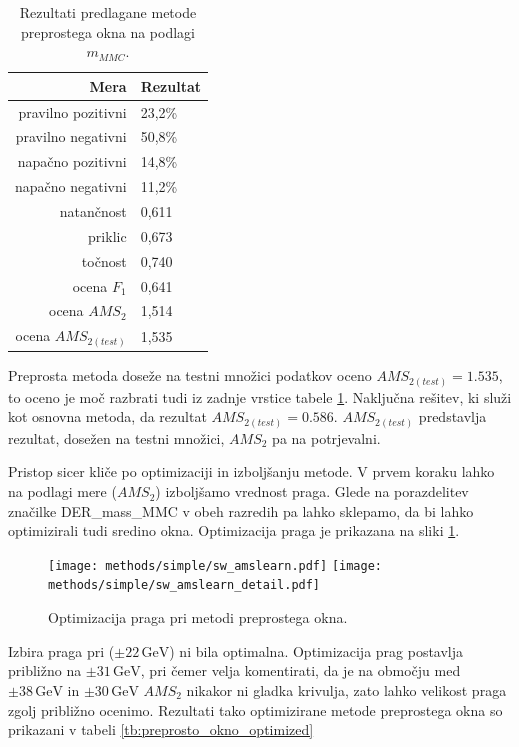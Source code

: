 \documentclass[11pt,a4paper,openany]{book}
\begin{document}
\begin{table}[ht]
	\centering
	\begin{tabular}{rl}
		\hline
		\textbf{Mera} & \textbf{Rezultat} \\
		\hline
		pravilno pozitivni & 23,2\%\\
		pravilno negativni & 50,8\% \\
		napačno pozitivni & 14,8\% \\
		napačno negativni & 11,2\% \\
		natančnost & 0,611 \\
		priklic & 0,673 \\
		točnost & 0,740 \\
		ocena $F_1$ & 0,641 \\
		ocena $AMS_2$ & 1,514 \\
		ocena $AMS_{2(test)}$ & 1,535 		
	\end{tabular}
	\caption{Rezultati predlagane metode preprostega okna na podlagi $m_{MMC}$.}
	\label{tb:preprosto_okno}
\end{table}

Preprosta metoda doseže na testni množici podatkov oceno $AMS_{2(test)} = \num{1,535}$, to oceno je moč razbrati tudi iz zadnje vrstice tabele \ref{tb:preprosto_okno}. Naključna rešitev, ki služi kot osnovna metoda, da rezultat $AMS_{2{(test)}} = \num{0,586}$. $AMS_{2(test)}$ predstavlja rezultat, dosežen na testni množici, $AMS_2$ pa na potrjevalni.

Pristop sicer kliče po optimizaciji in izboljšanju metode. V prvem koraku lahko na podlagi mere ($AMS_2$) izboljšamo vrednost praga. Glede na porazdelitev značilke DER\_mass\_MMC v obeh razredih pa lahko sklepamo, da bi lahko optimizirali tudi sredino okna. Optimizacija praga je prikazana na sliki \ref{sl:simple_optimization_threshold}.

\begin{figure}[h]
	\centering	
	\texttt{[image: methods/simple/sw\_amslearn.pdf]}
	\texttt{[image: methods/simple/sw\_amslearn\_detail.pdf]}		
	
	\caption{Optimizacija praga pri metodi preprostega okna.}
	\label{sl:simple_optimization_threshold}
\end{figure}

Izbira praga pri ($\pm 22\,\text{GeV}$) ni bila optimalna. Optimizacija prag postavlja približno na $\pm 31\,\text{GeV}$, pri čemer velja komentirati, da je na območju med $\pm 38\,\text{GeV}$ in $\pm 30\,\text{GeV}$ $AMS_2$ nikakor ni gladka krivulja, zato lahko velikost praga zgolj približno ocenimo. Rezultati tako optimizirane metode preprostega okna so prikazani v tabeli \ref{tb:preprosto_okno_optimized}
\end{document}
